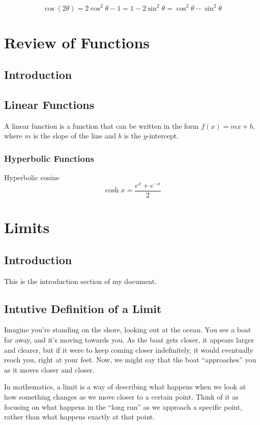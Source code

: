 \documentclass{book}
\begin{document}
\begin{equation} 
	\cos (2\theta) = 2\cos^2 \theta -1 =1-2\sin^2 \theta = \cos ^2 \theta - \sin^2 \theta
\end{equation}



\chapter{Review of Functions}
\section{Introduction}


\section{Linear Functions}
A linear function is a function that can be written in the form $f(x) = mx + b$, where $m$ is the slope of the line and $b$ is the $y$-intercept.

\subsection{Hyperbolic Functions}

Hyperbolic cosine 
\begin{equation}
	\cosh x = \frac{e^x + e^{-x}}{2}
\end{equation}

\chapter{Limits}
\section{Introduction}
This is the introduction section of my document.
\section{Intutive Definition of a Limit}
Imagine you’re standing on the shore, looking out at the ocean. You see a boat far away, and it’s moving towards you. As the boat gets closer, it appears larger and clearer, but if it were to keep coming closer indefinitely, it would eventually reach you, right at your feet. Now, we might say that the boat “approaches” you as it moves closer and closer.

In mathematics, a limit is a way of describing what happens when we look at how something changes as we move closer to a certain point. Think of it as focusing on what happens in the “long run” as we approach a specific point, rather than what happens exactly at that point.
\end{document}
